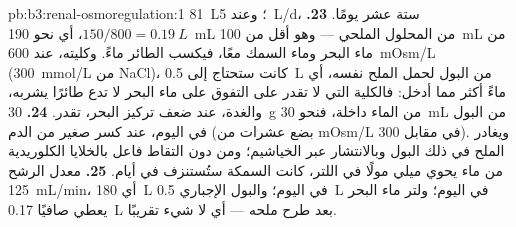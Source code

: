 \begin{solution}{pb:b3:renal-osmoregulation:1}
\qty{81}{L}؛ وعند \qty{5}{L/d}، ستة عشر يومًا.
\textbf{23.} $150/800 = \qty{0.19}{L}$، أي نحو \qty{190}{mL} من
المحلول الملحي --- وهو أقل من \qty{100}{mL} من ماء البحر وماء
السمك معًا، فيكسب الطائر ماءً. وكليته، عند \qty{600}{mOsm/L}
(\qty{300}{mmol/L} من NaCl)، كانت ستحتاج إلى \qty{0.5}{L} من
البول لحمل الملح نفسه، أي ماءً أكثر مما أدخل: فالكلية التي
لا تقدر على التفوق على ماء البحر لا تدع طائرًا يشربه،
والغدة، عند ضعف تركيز البحر، تقدر.
\textbf{24.} \qty{30}{g} من الماء داخلة، فنحو \qty{30}{mL} من
البول في اليوم، عند كسر صغير من  الدم (بضع عشرات من
mOsm/L في مقابل \num{300}). ويغادر الملح في ذلك البول
وبالانتشار عبر الخياشيم؛ ومن دون التقاط فاعل بالخلايا
الكلوريدية من ماء يحوي ميلي مولًا في اللتر، كانت السمكة
ستُستنزف في أيام.
\textbf{25.} معدل الرشح \qty{125}{mL/min}، أي \qty{180}{L} في
اليوم؛ والبول الإجباري \qty{0.5}{L} في اليوم؛ ولتر ماء البحر
يعطي صافيًا \qty{0.17}{L} بعد طرح ملحه --- أي لا شيء تقريبًا.
\end{solution}
